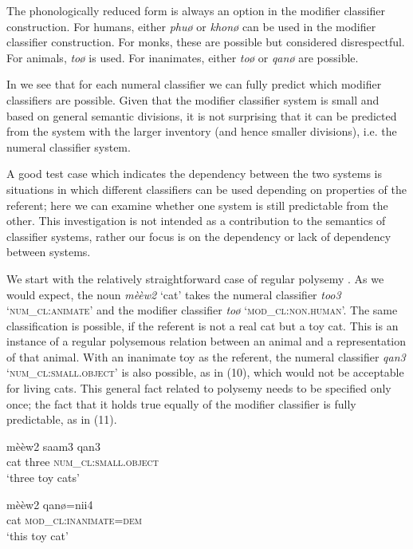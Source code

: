\documentclass[output=paper]{langsci/langscibook}
\begin{document}
 The phonologically reduced form is always an option in the modifier classifier construction. For humans, either \textit{phuø} or \textit{khonø} can be used in the modifier classifier construction. For monks, these are possible but considered disrespectful. For animals, \textit{toø} is used. For inanimates, either \textit{toø} or \textit{qanø} are possible. 

 In  we see that for each numeral classifier we can fully predict which modifier classifiers are possible. Given that the modifier classifier system is small and based on general semantic divisions, it is not surprising that it can be predicted from the system with the larger inventory (and hence smaller divisions), i.e. the numeral classifier system.

A good test case which indicates the dependency between the two systems is situations in which different classifiers can be used depending on properties of the referent; here we can examine whether one system is still predictable from the other. This investigation is not intended as a contribution to the semantics of classifier systems, rather our focus is on the dependency or lack of dependency between systems.

We start with the relatively straightforward case of regular polysemy  \citep{Apresjan1974,Nunberg1996}. As we would expect, the noun \textit{mèèw2} ‘cat’ takes the numeral classifier \textit{too3} ‘\textsc{num\_cl}:\textsc{animate}’ and the modifier classifier \textit{toø } ‘\textsc{mod\_cl}:\textsc{non.human}’. The same classification is possible, if the referent is not a real cat but a toy cat. This is an instance of a regular polysemous relation between an animal and a representation of that animal. With an inanimate toy as the referent, the numeral classifier \textit{qan3} ‘\textsc{num\_cl}:\textsc{small.object}’ is also possible, as in (10), which would not be acceptable for living cats. This general fact related to polysemy needs to be specified only once; the fact that it holds true equally of the modifier classifier is fully predictable, as in (11).

\ea%
    \label{ex:fc:10}
    \gll    mèèw2  saam3  qan3\\
    cat      three    \textsc{num\_cl}:\textsc{small.object}	\\
    \glt ‘three toy cats’
    \z

\ea%
    \label{ex:fc:11}
    \gll   mèèw2  qanø=nii4\\
    cat      \textsc{mod\_cl}:\textsc{inanimate}=\textsc{dem}	\\
    \glt  ‘this toy cat’
    \z
\end{document}
